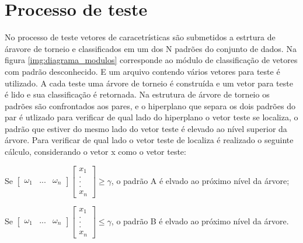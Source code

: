\section{Processo de teste}
No processo de teste vetores de caracetrísticas são submetidos a estrtura de áravore de torneio e classificados em um dos N padrões do conjunto de dados.
Na figura \ref{img:diagrama_modulos} corresponde ao módulo de classificação de vetores com padrão desconhecido. E um arquivo contendo vários vetores para teste é utilizado.  A cada teste uma árvore de torneio é construída e um vetor para teste é lido e sua classificação é retornada. Na estrutura de árvore de torneio os padrões são confrontados aos pares, e o hiperplano que separa os dois padrões do par é utlizado para verificar de qual lado do hiperplano o vetor teste se localiza, o padrão que estiver do mesmo lado do vetor teste é elevado ao nível superior da árvore. Para verificar de qual lado o vetor teste de localiza é realizado o seguinte cálculo, considerando o vetor x como o vetor teste:

Se $ \begin{bmatrix}
\omega _{1} & ... & \omega _{n} 
\end{bmatrix}
\begin{bmatrix}
x_{1}
\\ 
.
\\
. 
\\
. 
\\
x_{n}
\end{bmatrix}
\geq \gamma $, o padrão A é elvado ao próximo nível da árvore;

Se $ \begin{bmatrix}
\omega _{1} & ... & \omega _{n} 
\end{bmatrix}
\begin{bmatrix}
x_{1}
\\ 
.
\\
. 
\\
. 
\\
x_{n}
\end{bmatrix}
\leq  \gamma $, o padrão B é elvado ao próximo nível da árvore.

